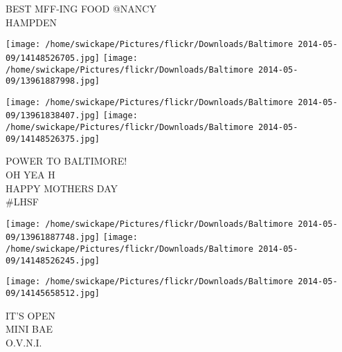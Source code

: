 \documentclass[10pt,letterpaper]{article}
\begin{document}
BEST MFF{-}ING FOOD @NANCY\\
HAMPDEN
\pagebreak

\texttt{[image: /home/swickape/Pictures/flickr/Downloads/Baltimore 2014-05-09/14148526705.jpg]}
\texttt{[image: /home/swickape/Pictures/flickr/Downloads/Baltimore 2014-05-09/13961887998.jpg]}

\texttt{[image: /home/swickape/Pictures/flickr/Downloads/Baltimore 2014-05-09/13961838407.jpg]}
\texttt{[image: /home/swickape/Pictures/flickr/Downloads/Baltimore 2014-05-09/14148526375.jpg]}

POWER TO BALTIMORE!\\
OH YEA H\\
HAPPY MOTHERS DAY\\
\#LHSF
\pagebreak

\texttt{[image: /home/swickape/Pictures/flickr/Downloads/Baltimore 2014-05-09/13961887748.jpg]}
\texttt{[image: /home/swickape/Pictures/flickr/Downloads/Baltimore 2014-05-09/14148526245.jpg]}

\texttt{[image: /home/swickape/Pictures/flickr/Downloads/Baltimore 2014-05-09/14145658512.jpg]}

IT'S OPEN\\
MINI BAE\\
O.V.N.I.
\pagebreak
\end{document}
